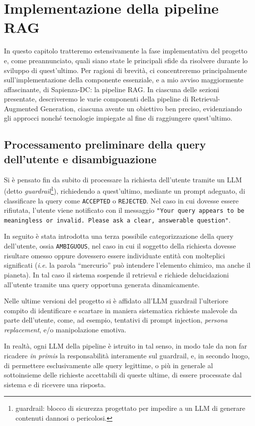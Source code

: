 \chapter{Implementazione della pipeline RAG}

In questo capitolo tratteremo estensivamente la fase implementativa del progetto e, come preannunciato, quali siano state le principali sfide da risolvere durante lo sviluppo di quest'ultimo. Per ragioni di brevità, ci concentreremo principalmente sull'implementazione della componente essenziale, e a mio avviso maggiormente affascinante, di Sapienza-DC: la pipeline RAG. In ciascuna delle sezioni presentate, descriveremo le varie componenti della pipeline di Retrieval-Augmented Generation, ciascuna avente un obiettivo ben preciso, evidenziando gli approcci nonché tecnologie impiegate al fine di raggiungere quest'ultimo.    
\section{Processamento preliminare della query dell'utente e disambiguazione}
Si è pensato fin da subito di processare la richiesta dell'utente tramite un LLM (detto \textit{guardrail}\footnote{guardrail: blocco di sicurezza progettato per impedire a un LLM di generare contenuti dannosi o pericolosi.}), richiedendo a quest'ultimo, mediante un prompt adeguato, di classificare la query come \texttt{ACCEPTED} o \texttt{REJECTED}. Nel caso in cui dovesse essere rifiutata, l'utente viene notificato con il messaggio \texttt{"Your query appears to be meaningless or invalid. Please ask a clear, answerable question"}. 

In seguito è stata introdotta una terza possibile categorizzazione della query dell'utente, ossia \texttt{AMBIGUOUS}, nel caso in cui il soggetto della richiesta dovesse risultare omesso oppure dovessero essere individuate entità con
molteplici significati (\textit{i.e.} la parola ``mercurio'' può intendere l'elemento chimico, ma anche il pianeta). In tal caso il sistema sospende il retrieval e richiede delucidazioni all’utente tramite
una query opportuna generata dinamicamente.

Nelle ultime versioni del progetto si è affidato all'LLM guardrail l'ulteriore compito di identificare e scartare in maniera sistematica richieste malevole da parte dell'utente, come, ad esempio, tentativi di prompt injection, \textit{persona replacement}, e/o manipolazione emotiva.

In realtà, ogni LLM della pipeline è istruito in tal senso, in modo tale da non far ricadere \textit{in primis} la responsabilità interamente sul guardrail, e, in secondo luogo, di permettere esclusivamente alle query legittime, o più in generale al sottoinsieme delle richieste accettabili di queste ultime, di essere processate dal sistema e di ricevere una risposta.

